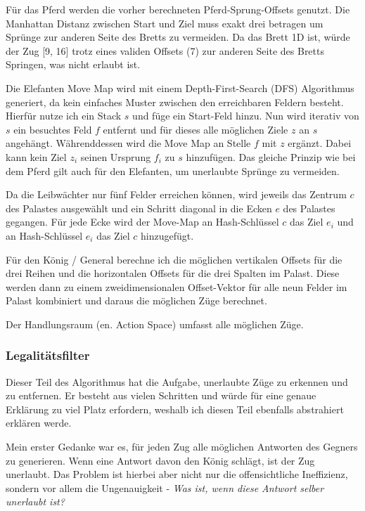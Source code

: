 \documentclass{jpp}
\begin{document}
Für das Pferd werden die vorher berechneten Pferd-Sprung-Offsets genutzt. Die Manhattan Distanz zwischen Start und Ziel muss exakt drei betragen um Sprünge zur anderen Seite des Bretts zu vermeiden. Da das Brett 1D ist, würde der Zug [9, 16] trotz eines validen Offsets (7) zur anderen Seite des Bretts Springen, was nicht erlaubt ist.

Die Elefanten Move Map wird mit einem Depth-First-Search (DFS) Algorithmus generiert, da kein einfaches Muster zwischen den erreichbaren Feldern besteht. Hierfür nutze ich ein Stack $s$ und füge ein Start-Feld hinzu. Nun wird iterativ von $s$ ein besuchtes Feld $f$ entfernt und für dieses alle möglichen Ziele $z$ an $s$ angehängt. Währenddessen wird die Move Map an Stelle $f$ mit $z$ ergänzt. Dabei kann kein Ziel $z_i$ seinen Ursprung $f_i$ zu $s$ hinzufügen. Das gleiche Prinzip wie bei dem Pferd gilt auch für den Elefanten, 
um unerlaubte Sprünge zu vermeiden.

Da die Leibwächter nur fünf Felder erreichen können, wird jeweils das Zentrum $c$ des Palastes ausgewählt und ein Schritt diagonal in die Ecken $e$ des Palastes gegangen. Für jede Ecke wird der Move-Map an Hash-Schlüssel $c$ das Ziel $e_i$ und an Hash-Schlüssel $e_i$ das Ziel $c$ hinzugefügt.

Für den König / General berechne ich die möglichen vertikalen Offsets für die drei Reihen und die horizontalen Offsets für die drei Spalten im Palast. Diese werden dann zu einem zweidimensionalen Offset-Vektor für alle neun Felder im Palast kombiniert und daraus die möglichen Züge berechnet. 

Der Handlungsraum (en. Action Space) umfasst alle möglichen Züge.

\subsubsection{Legalitätsfilter}
Dieser Teil des Algorithmus hat die Aufgabe, unerlaubte Züge zu erkennen und zu entfernen. Er besteht aus vielen Schritten und würde für eine genaue Erklärung zu viel Platz erfordern, weshalb ich diesen Teil ebenfalls abstrahiert erklären werde.

Mein erster Gedanke war es, für jeden Zug alle möglichen Antworten des Gegners zu generieren. Wenn eine Antwort davon den König schlägt, ist der Zug unerlaubt. Das Problem ist hierbei aber nicht nur die offensichtliche Ineffizienz, sondern vor allem die Ungenauigkeit - \textit{Was ist, wenn diese Antwort selber unerlaubt ist?}
\end{document}
